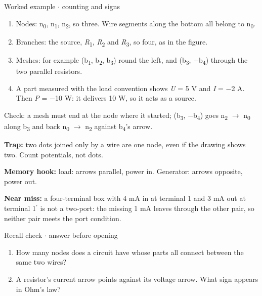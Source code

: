 \documentclass[11pt]{article}
\begin{document}
\begin{keepsection}
\begin{keepsection}
\begin{workedbox}{Worked example \ensuremath{\cdot} counting and signs}
\begin{enumerate}
\item Nodes: n\textsubscript{0}, n\textsubscript{1}, n\textsubscript{2}, so three. Wire segments along the bottom all belong to n\textsubscript{0}.
\item Branches: the source, \textit{R}\textsubscript{1}, \textit{R}\textsubscript{2} and \textit{R}\textsubscript{3}, so four, as in the figure.
\item Meshes: for example (b\textsubscript{1}, b\textsubscript{2}, b\textsubscript{3}) round the left, and (b\textsubscript{3}, \ensuremath{-}b\textsubscript{4}) through the two parallel resistors.
\item A part measured with the load convention shows \textit{U} = 5 V and \textit{I} = \ensuremath{-}2 A. Then \textit{P} = \ensuremath{-}10 W: it delivers 10 W, so it acts as a source.
\end{enumerate}

Check: a mesh must end at the node where it started; (b\textsubscript{3}, \ensuremath{-}b\textsubscript{4}) goes n\textsubscript{2} \ensuremath{\to} n\textsubscript{0} along b\textsubscript{3} and back n\textsubscript{0} \ensuremath{\to} n\textsubscript{2} against b\textsubscript{4}’s arrow.
\end{workedbox}

\begin{notebox}\textbf{Trap:} two dots joined only by a wire are one node, even if the drawing shows two. Count potentials, not dots.\end{notebox}

\begin{notebox}\textbf{Memory hook:} load: arrows parallel, power in. Generator: arrows opposite, power out.\end{notebox}

\begin{notebox}\textbf{Near miss:} a four-terminal box with 4 mA in at terminal 1 and 3 mA out at terminal 1\ensuremath{{}^{\prime}} is not a two-port: the missing 1 mA leaves through the other pair, so neither pair meets the port condition.\end{notebox}

\begin{recallbox}{Recall check \ensuremath{\cdot} answer before opening}
\begin{enumerate}
\item How many nodes does a circuit have whose parts all connect between the same two wires?
\item A resistor’s current arrow points against its voltage arrow. What sign appears in Ohm’s law?
\end{enumerate}

\end{recallbox}
\end{keepsection}
\end{keepsection}
\end{document}
